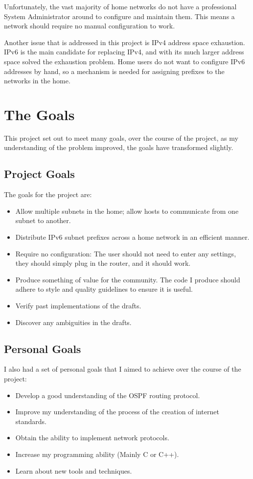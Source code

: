 \documentclass[12pt]{report}
\begin{document}
Unfortunately, the vast majority of home networks do not have a professional
System Administrator around to configure and maintain them. This means a
network should require no manual configuration to work.

Another issue that is addressed in this project is IPv4
 address space exhaustion. IPv6
is the main candidate for replacing IPv4, and with its much larger address
space solved the exhaustion problem. Home users do not want to configure IPv6
addresses by hand, so a mechanism is needed for assigning prefixes to the
networks in the home. 

\section{The Goals}
This project set out to meet many goals, over the course of the project, as my
understanding of the problem improved, the goals have transformed slightly.

\subsection{Project Goals}
The goals for the project are:

\begin{itemize}
\item Allow multiple subnets in the home; allow hosts to communicate from one
  subnet to another.
\item Distribute IPv6 subnet prefixes across a home network in an efficient
	manner. 
\item Require no configuration: The user should not need to enter any settings,
  they should simply plug in the router, and it should work.
\item Produce something of value for the community. The code I produce should
  adhere to style and quality guidelines to ensure it is useful.
\item Verify past implementations of the drafts.
\item Discover any ambiguities in the drafts.
\end{itemize}

\subsection{Personal Goals}
I also had a set of personal goals that I aimed to achieve over the course of
the project:
\begin{itemize}
	\item Develop a good understanding of the OSPF routing protocol.
	\item Improve my understanding of the process of the creation of internet
		standards.
	\item Obtain the ability to implement network protocols.
	\item Increase my programming ability (Mainly C or C++).
	\item Learn about new tools and techniques.
\end{itemize}
\end{document}
